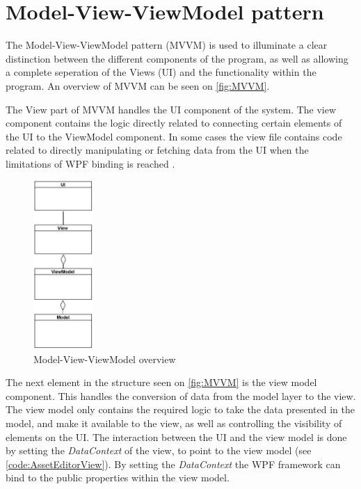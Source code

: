 \section{Model-View-ViewModel pattern} \label{sc:MVCVM}
The Model-View-ViewModel pattern (MVVM) is used to illuminate a clear distinction between the different components of the program, as well as allowing a complete seperation of the Views (UI) and the functionality within the program. An overview of MVVM can be seen on \autoref{fig:MVVM}. 
\par
The View part of MVVM handles the UI component of the system. The view component contains the logic directly related to connecting certain elements of the UI to the ViewModel component. In some cases the view file contains code related to directly manipulating or fetching data from the UI when the limitations of WPF binding is reached \citep{WPFandMVVM}.

\begin{figure}[H]
    \centering
    \includegraphics[width=0.2\textwidth]{figures/Implementation/MVVM.PNG}
    \caption{Model-View-ViewModel overview}
    \label{fig:MVVM}
\end{figure}

The next element in the structure seen on \autoref{fig:MVVM} is the view model component. This handles the conversion of data from the model layer to the view. The view model only contains the required logic to take the data presented in the model, and make it available to the view, as well as controlling the visibility of elements on the UI. The interaction between the UI and the view model is done by setting the \textit{DataContext} of the view, to point to the view model (see \autoref{code:AssetEditorView}). By setting the \textit{DataContext} the WPF framework can bind to the public properties within the view model. \citep{WPFandMVVM}

